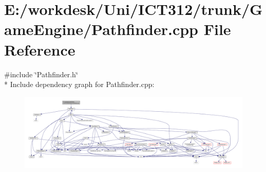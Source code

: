 \section{E\+:/workdesk/\+Uni/\+I\+C\+T312/trunk/\+Game\+Engine/\+Pathfinder.cpp File Reference}
\label{_pathfinder_8cpp}
{\ttfamily \#include \char`\"{}Pathfinder.\+h\char`\"{}}\\*
Include dependency graph for Pathfinder.\+cpp\+:
\nopagebreak
\begin{figure}[H]
\begin{center}
\leavevmode
\includegraphics[width=350pt]{d5/de8/_pathfinder_8cpp__incl}
\end{center}
\end{figure}
